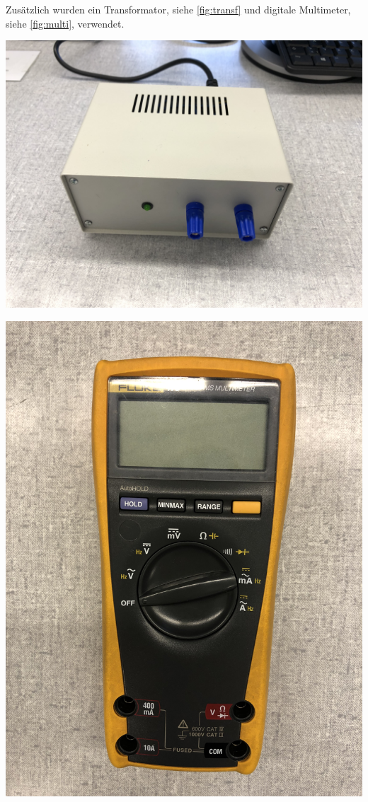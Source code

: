\documentclass[11pt,ngerman]{scrartcl}
\begin{document}
Zusätzlich wurden ein Transformator, siehe \autoref{fig:transf} und digitale Multimeter, siehe \autoref{fig:multi}, verwendet.

\vspace{2mm}

\begin{minipage}{\textwidth}
	\begin{minipage}[t]{0.5\textwidth}
		\centering
		\includegraphics[width=\textwidth]{trafo}
		\label{fig:transf}
	\end{minipage}
	\vspace{2mm}
	\begin{minipage}[t]{0.5\textwidth}
		\centering
		\includegraphics[angle = -90,width=\textwidth]{multi}

\end{minipage}
\end{minipage}
\end{document}
